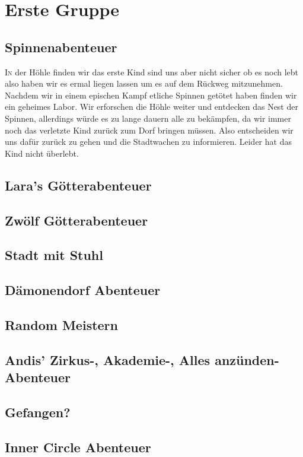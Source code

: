 \chapter{Erste Gruppe}
\section{Spinnenabenteuer}
\lettrine{I}{n} der H\"ohle finden wir das erste Kind sind uns aber nicht sicher ob es noch lebt also haben wir es ermal liegen lassen um es auf dem R\"uckweg mitzunehmen. Nachdem wir in einem epischen Kampf etliche Spinnen get\"otet haben finden wir ein geheimes Labor. Wir erforschen die H\"ohle weiter und entdecken das Nest der Spinnen, allerdings w\"urde es zu lange dauern alle zu bek\"ampfen, da wir immer noch das verletzte Kind zur\"uck zum Dorf bringen m\"ussen. Also entscheiden wir uns daf\"ur zur\"uck zu gehen und die Stadtwachen zu informieren. Leider hat das Kind nicht \"uberlebt.

\section{Lara's G\"otterabenteuer}
\section{Zw\"olf G\"otterabenteuer}
\section{Stadt mit Stuhl}
\section{D\"amonendorf Abenteuer}
\section{Random Meistern}
\section{Andis' Zirkus-, Akademie-, Alles anz\"unden-Abenteuer}
\section{Gefangen?}
\section{Inner Circle Abenteuer}